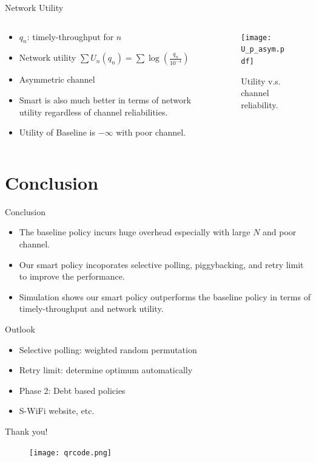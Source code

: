 \documentclass{beamer}
\begin{document}
\begin{frame}{Network Utility}
\begin{columns}
  \begin{column}{.5\textwidth}
  \begin{itemize}
    \item $q_n$: timely-throughput for $n$
    \item Network utility $\sum U_n(q_n) = \sum \log (\frac{q_n}{10^{-4}})$
    \item Asymmetric channel
    \item Smart is also much better in terms of network utility
      regardless of channel reliabilities.
    \item Utility of Baseline is $-\infty$ with poor channel.
  \end{itemize}
  \end{column}
  \begin{column}{.5\textwidth}
\begin{figure}[htbp]
  \centering
  \texttt{[image: U\_p\_asym.pdf]}
  \caption{Utility v.s. channel reliability.}
\end{figure}
  \end{column}
\end{columns}
\end{frame}

\section*{Conclusion}
\begin{frame}{Conclusion}
  \begin{itemize}
    \item The baseline policy incurs huge overhead especially with large $N$ and poor channel.
    \item Our smart policy incoporates selective polling, piggybacking, and
      retry limit to improve the performance.
    \item Simulation shows our smart policy outperforms the baseline policy in
      terms of timely-throughput and network utility.
  \end{itemize}
\end{frame}

\begin{frame}{Outlook}
  \begin{itemize}
    \item Selective polling: weighted random permutation
    \item Retry limit: determine optimum automatically
    \item Phase 2: Debt based policies
    \item S-WiFi website, etc.
  \end{itemize}
\end{frame}

\begin{frame}
  \begin{center}
    {\Huge\calligra Thank you!}
  \end{center}
  \begin{figure}[htbp]
    \centering
    \texttt{[image: qrcode.png]}
  \end{figure}
\end{frame}
\end{document}
